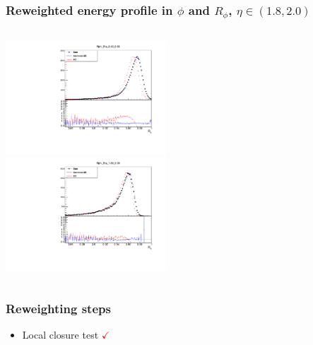 \documentclass{beamer}
\begin{document}
\begin{frame}
\frametitle{Reweighted energy profile in $\phi$ and $R_\phi$,  $\eta \in (1.8, 2.0)$}

\begin{columns}[t]
\centering
\includegraphics[width=6cm]{Rphi_Rew_Eta_4_6_Local_Rew.pdf}\\
\centering
\includegraphics[width=6cm]{Rphi_Rew_Eta_18_20_Local_Rew.pdf}
\end{columns}
\end{frame}
\begin{frame}
\frametitle{Reweighting steps}
\begin{itemize}
\item Local closure test \textcolor{red}{ $\checkmark$}\\

\end{itemize}
\end{frame}
\end{document}
